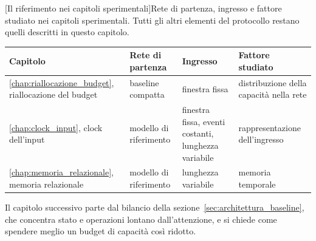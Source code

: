 \par\medskip\noindent
\begin{minipage}{\textwidth}
\small
\renewcommand{\arraystretch}{1.2}
[Il riferimento nei capitoli sperimentali]{Rete di partenza, ingresso e fattore studiato nei capitoli sperimentali. Tutti gli altri elementi del protocollo restano quelli descritti in questo capitolo.}
\label{tab:mappa_riferimenti}
\begin{tabularx}{\textwidth}{@{}>{\raggedright\arraybackslash}p{3.3cm} >{\raggedright\arraybackslash}p{3.0cm} >{\raggedright\arraybackslash}X >{\raggedright\arraybackslash}X@{}}
\hline
\textbf{Capitolo} & \textbf{Rete di partenza} & \textbf{Ingresso} & \textbf{Fattore studiato} \\
\hline
\ref{chap:riallocazione_budget}, riallocazione del budget & baseline compatta & finestra fissa & distribuzione della capacità nella rete \\
\ref{chap:clock_input}, clock dell'input & modello di riferimento & finestra fissa, eventi costanti, lunghezza variabile & rappresentazione dell'ingresso \\
\ref{chap:memoria_relazionale}, memoria relazionale & modello di riferimento & lunghezza variabile & memoria temporale \\
\hline
\end{tabularx}
\end{minipage}
\par\medskip

Il capitolo successivo parte dal bilancio della sezione~\ref{sec:architettura_baseline}, che concentra stato e operazioni lontano dall'attenzione, e si chiede come spendere meglio un budget di capacità così ridotto.
